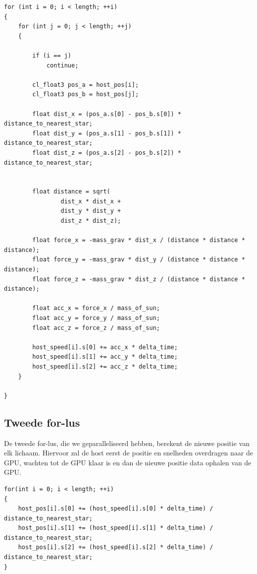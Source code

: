 \documentclass{article}
\begin{document}
\begin{lstlisting}[caption={De eerste for-lus}, label={code:for1}, breaklines=true, basicstyle=\footnotesize]
for (int i = 0; i < length; ++i)
{
    for (int j = 0; j < length; ++j)
    {

        if (i == j)
            continue;

        cl_float3 pos_a = host_pos[i];
        cl_float3 pos_b = host_pos[j];

        float dist_x = (pos_a.s[0] - pos_b.s[0]) * distance_to_nearest_star;
        float dist_y = (pos_a.s[1] - pos_b.s[1]) * distance_to_nearest_star;
        float dist_z = (pos_a.s[2] - pos_b.s[2]) * distance_to_nearest_star;


        float distance = sqrt(
                dist_x * dist_x +
                dist_y * dist_y +
                dist_z * dist_z);

        float force_x = -mass_grav * dist_x / (distance * distance * distance);
        float force_y = -mass_grav * dist_y / (distance * distance * distance);
        float force_z = -mass_grav * dist_z / (distance * distance * distance);

        float acc_x = force_x / mass_of_sun;
        float acc_y = force_y / mass_of_sun;
        float acc_z = force_z / mass_of_sun;

        host_speed[i].s[0] += acc_x * delta_time;
        host_speed[i].s[1] += acc_y * delta_time;
        host_speed[i].s[2] += acc_z * delta_time;
    }

}
\end{lstlisting}

\subsection{Tweede for-lus}
De tweede for-lus, die we geparalleliseerd hebben, berekent de nieuwe positie
van elk lichaam. Hiervoor zal de host eerst de positie en snelheden overdragen
naar de GPU, wachten tot de GPU klaar is en dan de nieuwe positie data ophalen
van de GPU.

\begin{lstlisting}[caption={De tweede for-lus}, label={code:for2}, breaklines=true, basicstyle=\footnotesize]
for(int i = 0; i < length; ++i)
{
    host_pos[i].s[0] += (host_speed[i].s[0] * delta_time) / distance_to_nearest_star;
    host_pos[i].s[1] += (host_speed[i].s[1] * delta_time) / distance_to_nearest_star;
    host_pos[i].s[2] += (host_speed[i].s[2] * delta_time) / distance_to_nearest_star;
}
\end{lstlisting}
\end{document}
